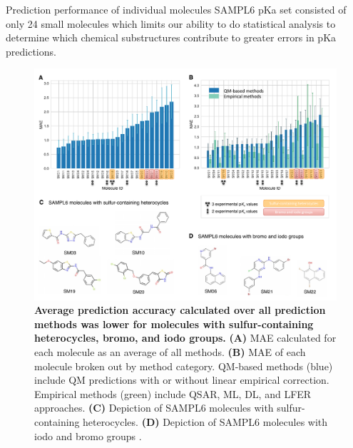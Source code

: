 \documentclass[9pt,lineno,final]{elife}
\begin{document}
Prediction performance of individual molecules
SAMPL6 pKa set consisted of only 24 small molecules which limits our ability to do statistical analysis to determine which chemical substructures contribute to greater errors in pKa predictions.










\begin{figure}
\centering
\includegraphics[width=1.0\linewidth]{figures/typeIII_molecular_MAE_fig.pdf}
\caption{{\bf Average prediction accuracy calculated over all prediction methods was lower for molecules with sulfur-containing heterocycles, bromo, and iodo groups.}
{\bf(A)} MAE calculated for each molecule as an average of all methods. {\bf(B)} MAE of each molecule broken out by method category. QM-based methods (blue) include QM predictions with or without linear empirical correction. Empirical methods (green) include QSAR, ML, DL, and LFER approaches. {\bf(C)} Depiction of SAMPL6 molecules with sulfur-containing heterocycles. {\bf(D)} Depiction of SAMPL6 molecules with iodo and bromo groups .
}
\label{fig:typeIII_molecular_MAE}
\end{figure}
\end{document}
